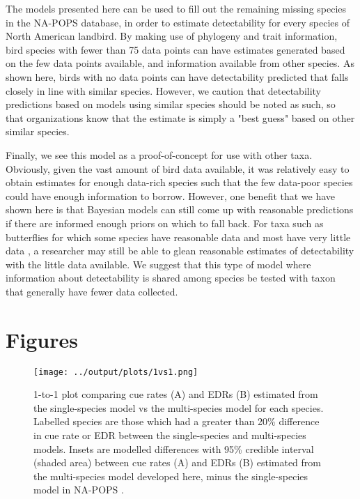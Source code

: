 \documentclass[12pt]{article}
\begin{document}
\par The models presented here can be used to fill out the remaining missing species in the NA-POPS database, in order to estimate detectability for every species of North American landbird.
By making use of phylogeny and trait information, bird species with fewer than 75 data points can have estimates generated based on the few data points available, and information available from other species.
As shown here, birds with no data points can have detectability predicted that falls closely in line with similar species.
However, we caution that detectability predictions based on models using similar species should be noted as such, so that organizations know that the estimate is simply a "best guess" based on other similar species.

\par Finally, we see this model as a proof-of-concept for use with other taxa.
Obviously, given the vast amount of bird data available, it was relatively easy to obtain estimates for enough data-rich species such that the few data-poor species could have enough information to borrow. 
However, one benefit that we have shown here is that Bayesian models can still come up with reasonable predictions if there are informed enough priors on which to fall back.
For taxa such as butterflies for which some species have reasonable data and most have very little data \citep{lewthwaite_geographical_2022}, a researcher may still be able to glean reasonable estimates of detectability with the little data available. 
We suggest that this type of model where information about detectability is shared among species be tested with taxon that generally have fewer data collected.



\section{Figures}

\begin{figure}[h]
	\texttt{[image: ../output/plots/1vs1.png]}
	\caption{1-to-1 plot comparing cue rates (A) and EDRs (B) estimated from the single-species model vs the multi-species model for each species. Labelled species are those which had a greater than 20\% difference in cue rate or EDR between the single-species and multi-species models. Insets are modelled differences with 95\% credible interval (shaded area) between cue rates (A) and EDRs (B) estimated from the multi-species model developed here, minus the single-species model in NA-POPS \citep{edwards_point_2023}.}
	\label{fig:1vs1}
\end{figure}
\end{document}
